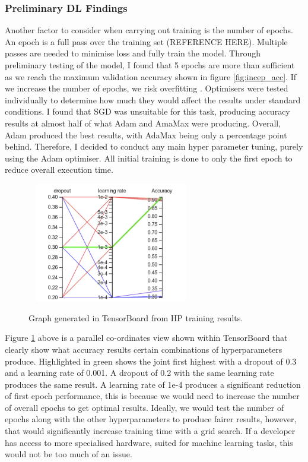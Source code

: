 \documentclass[12pt,a4paper]{report}
\begin{document}
\subsubsection{Preliminary DL Findings}

Another factor to consider when carrying out training is the number of epochs. An epoch is a full pass over the training
set (REFERENCE HERE). Multiple passes are needed to minimise loss and fully train the model. Through preliminary testing of the model, 
I found that 5 epochs are more than sufficient as we reach the maximum validation accuracy shown in figure 
\ref{fig:incep_acc}. If we 
increase the number of epochs, we risk overfitting \citep{geeksforgeeks}. Optimisers were tested individually to 
determine how much they would affect the results under standard conditions. I found that SGD was unsuitable for this 
task, producing accuracy results at almost half of what Adam and AmaMax were producing. Overall, Adam produced the best 
results, with AdaMax being only a percentage point behind. Therefore, I decided to conduct any main hyper parameter 
tuning, purely using the Adam optimiser. All initial training is done to only the first epoch to reduce overall 
execution time. 

\begin{figure}[h]\
    \centering
    \includegraphics[width=0.6\textwidth]{cross_graph.png}
    \caption{Graph generated in TensorBoard from HP training results.}
    \label{fig:cross}
\end{figure}

\break

Figure \ref{fig:cross} above is a parallel co-ordinates view shown within TensorBoard that clearly show what accuracy 
results 
certain combinations of hyperparameters produce. Highlighted in green shows the joint first highest with a dropout of 
0.3 and a learning rate of 0.001. A dropout of 0.2 with the same learning rate produces the same result. A learning rate
of 1e-4 produces a significant reduction of first epoch performance, this is because we would need to increase the 
number of overall epochs to get optimal results. Ideally, we would test the number of epochs along with the other 
hyperparameters to produce fairer results, however, that would significantly increase training time with a grid search. 
If a developer has access to more specialised hardware, suited for machine learning tasks, this would not be too much of
an issue.
\end{document}
